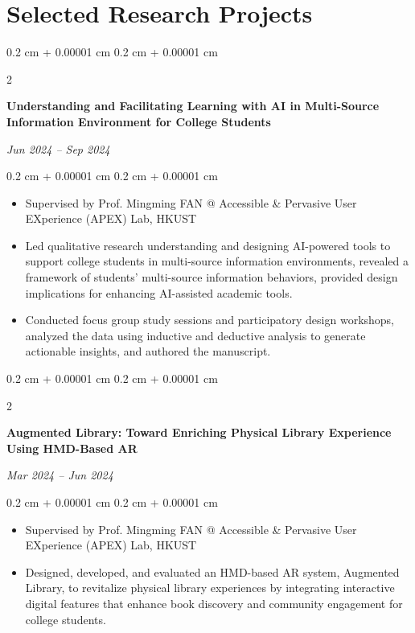 \documentclass[10pt, letterpaper]{article}
\newenvironment{highlights}{
    \begin{itemize}[
        topsep=0.10 cm,
        parsep=0.10 cm,
        partopsep=0pt,
        itemsep=0pt,
        leftmargin=0.4 cm + 10pt
    ]
}{
    \end{itemize}
} %
\newenvironment{onecolentry}{
    \begin{adjustwidth}{
        0.2 cm + 0.00001 cm
    }{
        0.2 cm + 0.00001 cm
    }
}{
    \end{adjustwidth}
} %
\newenvironment{twocolentry}[2][]{
    \onecolentry
    \def\secondColumn{#2}
    \setcolumnwidth{\fill, 4.5 cm}
    \begin{paracol}{2}
}{
    \switchcolumn \raggedleft \secondColumn
    \end{paracol}
    \endonecolentry
} %
\begin{document}
    \section{Selected Research Projects}

        \begin{twocolentry}{
        \textit{Jun 2024 – Sep 2024}}
            \textbf{Understanding and Facilitating Learning with AI in Multi-Source Information Environment for College Students}
        \end{twocolentry}

        \vspace{0.10 cm}
        \begin{onecolentry}
            \begin{highlights}
                \item Supervised by Prof. Mingming FAN @ Accessible \& Pervasive User EXperience (APEX) Lab, HKUST
                \item Led qualitative research understanding and designing AI-powered tools to support college students in multi-source information environments, revealed a framework of students' multi-source information behaviors, provided design implications for enhancing AI-assisted academic tools.
                \item Conducted focus group study sessions and participatory design workshops, analyzed the data using inductive and deductive analysis to generate actionable insights, and authored the manuscript.
            \end{highlights}
        \end{onecolentry}

        \vspace{0.2 cm}

        \begin{twocolentry}{
        \textit{Mar 2024 – Jun 2024}}
            \textbf{Augmented Library: Toward Enriching Physical Library Experience Using HMD-Based AR}
        \end{twocolentry}

        \vspace{0.10 cm}
        \begin{onecolentry}
            \begin{highlights}
                \item Supervised by Prof. Mingming FAN @ Accessible \& Pervasive User EXperience (APEX) Lab, HKUST
                \item Designed, developed, and evaluated an HMD-based AR system, Augmented Library, to revitalize physical library experiences by integrating interactive digital features that enhance book discovery and community engagement for college students.
            \end{highlights}
        \end{onecolentry}
\end{document}

